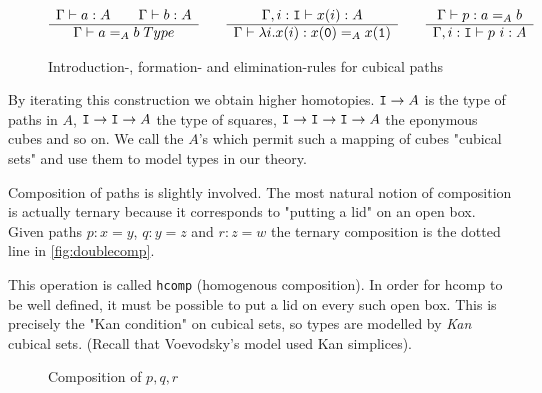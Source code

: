 \begin{figure}[h]
\begin{equation*}
  \begin{array}[t]{c}
    \Gamma \vdash a : A \qquad \Gamma \vdash b : A\\
    \hline
    \Gamma \vdash a =_A b \; Type\\
  \end{array}
  \qquad
  \begin{array}[t]{c}
    \Gamma, i : \texttt{I} \vdash x(i) : A\\
    \hline
    \Gamma \vdash \lambda i.x(i) : x(\texttt{0}) =_A x(\texttt{1})\\
  \end{array}
  \qquad
  \begin{array}[t]{c}
    \Gamma \vdash p : a =_A b\\
    \hline
    \Gamma, i : \texttt{I} \vdash p~i : A
  \end{array}
\end{equation*}
  \caption{Introduction-, formation- and elimination-rules for cubical paths}
  \label{eq:path-rules}
\end{figure}

By iterating this construction we obtain higher homotopies. $\texttt{I} \rightarrow A$
is the type of paths in $A$, $\texttt{I} \rightarrow \texttt{I} \rightarrow A$ the type of squares,
$\texttt{I} \rightarrow \texttt{I} \rightarrow \texttt{I} \rightarrow A$ the eponymous cubes and so on.
We call the $A$'s which permit such a mapping of cubes "cubical sets" and use
them to model types in our theory.

Composition of paths is slightly involved. The most natural notion of composition
is actually ternary because it corresponds to "putting a lid" on an open box. Given
paths $p : x = y$, $q : y = z$ and $r : z = w$ the ternary composition is the dotted line
in \autoref{fig:doublecomp}.

This operation is called \texttt{hcomp} (homogenous composition). In order for hcomp
to be well defined, it must be possible to put a lid on every such open box. This is precisely
the "Kan condition" on cubical sets, so types are modelled by \emph{Kan} cubical sets. (Recall
that Voevodsky's model used Kan simplices).

\begin{figure}[h]
\centering
{}
\caption{Composition of $p,q,r$}
\label{fig:doublecomp}
\end{figure}

